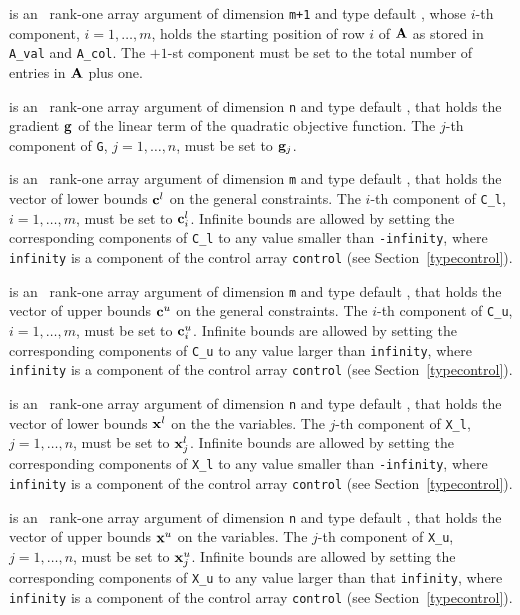 \documentclass{galahad}
\begin{document}
\begin{description}
 is an \intentin\ rank-one array argument
of dimension {\tt m+1} and type default \integer,
whose $i$-th component, $i = 1, \ldots , m$, holds the  starting position
of row $i$ of ${\mathbf{A}}$ as stored in {\tt A\_val} and {\tt A\_col}.
The $+1$-st component must be set to the total number of entries
in ${\mathbf{A}}$ plus one.

 is an \intentin\ rank-one array argument of dimension {\tt n}
and type default \realdp, that holds the gradient ${\mathbf{g}}$
of the linear term of the quadratic objective function.
The $j$-th component of {\tt G}, $j = 1,  \ldots ,  n$, must be set to
${\mathbf{g}}_{j}$.

 is an \intentin\ rank-one array argument of dimension {\tt m}
and type default \realdp, that holds the vector of lower bounds ${\mathbf{c}}^{l}$
on the general constraints. The $i$-th component of
{\tt C\_l}, $i = 1, \ldots , m$, must be set to ${\mathbf{c}}_{i}^{l}$.
Infinite bounds are allowed by setting the corresponding
components of {\tt C\_l} to any value smaller than {\tt -infinity},
where {\tt infinity} is a component of the control array {\tt control}
(see Section~\ref{typecontrol}).

 is an \intentin\ rank-one array argument of dimension {\tt m}
and type default \realdp, that holds the vector of upper bounds ${\mathbf{c}}^{u}$
on the general constraints. The $i$-th component of
{\tt C\_u}, $i = 1,  \ldots ,  m$, must be set to ${\mathbf{c}}_{i}^{u}$.
Infinite bounds are allowed by setting the corresponding
components of {\tt C\_u} to any value larger than {\tt infinity},
where {\tt infinity} is a component of the control array {\tt control}
(see Section~\ref{typecontrol}).

 is an \intentin\ rank-one array argument of dimension {\tt n}
and type default \realdp, that holds
the vector of lower bounds ${\mathbf{x}}^{l}$ on the the variables.
The $j$-th component of {\tt X\_l}, $j = 1, \ldots , n$,
must be set to ${\mathbf{x}}_{j}^{l}$.
Infinite bounds are allowed by setting the corresponding
components of {\tt X\_l} to any value smaller than {\tt -infinity},
where {\tt infinity} is a component of the control array {\tt control}
(see Section~\ref{typecontrol}).

 is an \intentin\  rank-one array argument of dimension {\tt n}
and type default \realdp, that holds
the vector of upper bounds ${\mathbf{x}}^{u}$ on the variables.
The $j$-th component of {\tt X\_u}, $j = 1, \ldots , n$,
must be set to ${\mathbf{x}}_{j}^{u}$.
Infinite bounds are allowed by setting the corresponding
components of {\tt X\_u} to any value larger than that {\tt infinity},
where {\tt infinity} is a component of the control array {\tt control}
(see Section~\ref{typecontrol}).


\end{description}
\end{document}
